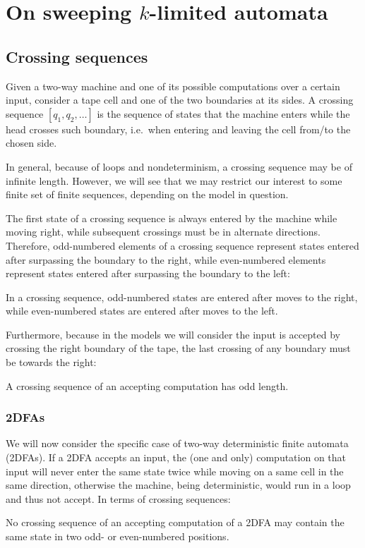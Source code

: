 \chapter{On sweeping \texorpdfstring{$k$-limited}{k-limited} automata}






\section{Crossing sequences}
Given a two-way machine and one of its possible computations over a certain input, consider a tape cell and one of the two boundaries at its sides.
A crossing sequence $[q_1,q_2,\dots]$ is the sequence of states that the machine enters while the head crosses such boundary, i.e.\ when entering and leaving the cell from/to the chosen side.

In general, because of loops and nondeterminism, a crossing sequence may be of infinite length.
However, we will see that we may restrict our interest to some finite set of finite sequences, depending on the model in question.

The first state of a crossing sequence is always entered by the machine while moving right, while subsequent crossings must be in alternate directions.
Therefore, odd-numbered elements of a crossing sequence represent states entered after surpassing the boundary to the right, while even-numbered elements represent states entered after surpassing the boundary to the left:
\begin{fact}\label{fact:crossing-parity}
	In a crossing sequence, odd-numbered states are entered after moves to the right, while even-numbered states are entered after moves to the left.
\end{fact}

Furthermore, because in the models we will consider the input is accepted by crossing the right boundary of the tape, the last crossing of any boundary must be towards the right:
\begin{fact}\label{fact:crossing-length}
	A crossing sequence of an accepting computation has odd length.
\end{fact}


\subsection{2DFAs}
We will now consider the specific case of two-way deterministic finite automata (2DFAs).
If a 2DFA accepts an input, the (one and only) computation on that input will never enter the same state twice while moving on a same cell in the same direction, otherwise the machine, being deterministic, would run in a loop and thus not accept.
In terms of crossing sequences:
\begin{fact}\label{fact:crossing-2dfa-parity}
	No crossing sequence of an accepting computation of a 2DFA may contain the same state in two odd- or even-numbered positions.
\end{fact}

